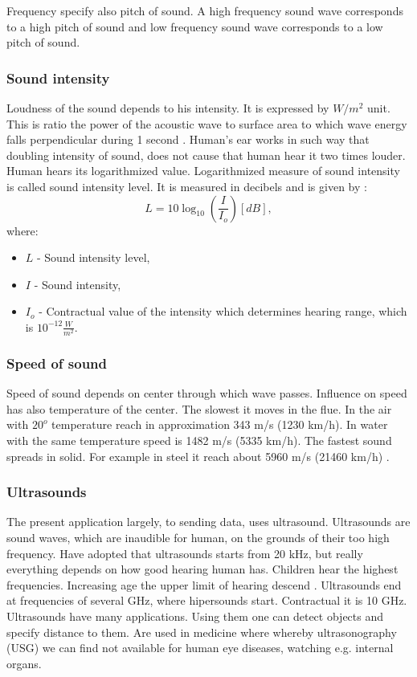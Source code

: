 \documentclass[11pt,titlepage]{article}
\theoremstyle{plain}
\begin{document}
Frequency specify also pitch of sound. A high frequency sound wave corresponds to a high pitch of sound and low frequency sound wave corresponds to a low pitch of sound.

\subsubsection{Sound intensity}
Loudness of the sound depends to his intensity. It is expressed by $W/m^2$ unit. This is ratio the power of the acoustic wave to surface area to which wave energy falls perpendicular during 1 second \cite{sound_intensity}. Human's ear works in such way that doubling intensity of sound, does not cause that human hear it two times louder. Human hears its logarithmized value. Logarithmized measure of sound intensity is called sound intensity level. It is measured in decibels and is given by \cite{decibels}:
\begin{equation}
	L = 10\log_{10}\left(\frac{I}{I_o}\right)  [dB],
\end{equation}
where:
\begin{itemize}
	\item $L$ - Sound intensity level,
	\item $I$ - Sound intensity,
	\item $I_o$ - Contractual value of the intensity which determines hearing range, which is $10^{-12}\frac{W}{m^2}.$
\end{itemize}
\subsubsection{Speed of sound}

Speed of sound depends on center through which wave passes. Influence on speed has also temperature of the center. The slowest it moves in the flue. In the air with $20^o$ temperature reach in  approximation 343 m/s (1230 km/h). In water with the same temperature speed is 1482 m/s (5335 km/h). The fastest sound spreads in solid. For example in steel it reach about 5960 m/s (21460 km/h) \cite{sound_speed}.

\subsubsection{Ultrasounds}
The present application largely, to sending data, uses ultrasound. Ultrasounds are sound waves, which are inaudible for human, on the grounds of their too high frequency. Have adopted that ultrasounds starts from 20 kHz, but really everything depends on how good hearing human has. Children hear the highest frequencies. Increasing age the upper limit of hearing descend \cite{limit_sound}. Ultrasounds end at frequencies of several GHz, where hipersounds start. Contractual it is 10 GHz.  Ultrasounds have many applications. Using them one can detect objects and specify distance to them. Are used in medicine where whereby ultrasonography (USG) we can find not available for human eye diseases, watching e.g. internal organs. 
\end{document}
